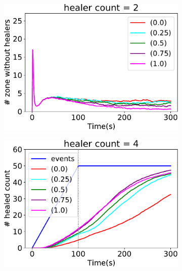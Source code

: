 \begin{figure}[t!]
\begin{subfigure}[b]{0.32\textwidth}
\includegraphics[width=\textwidth]{papers/mdpi2020/imgs/empty-zone-2.pdf}
\end{subfigure}
\par\bigskip %
\centering
\begin{subfigure}[b]{0.32\textwidth}
\centering
\includegraphics[width=\textwidth]{papers/mdpi2020/imgs/healed-4.pdf}
\end{subfigure}
\hfill
%
\begin{subfigure}[b]{0.32\textwidth}
\centering

\end{subfigure}
\end{figure}

